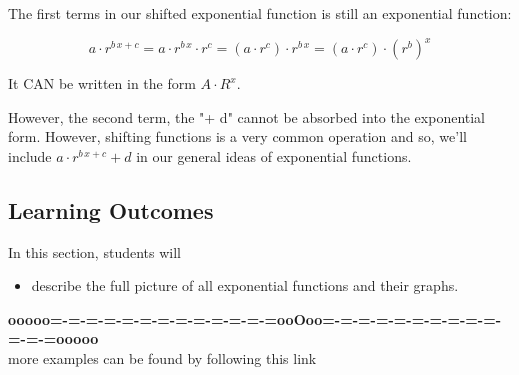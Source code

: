 \documentclass{ximera}
\begin{document}
The first terms in our shifted exponential function is still an exponential function:

\[
a \cdot r^{b \, x + c} = a \cdot r^{b \, x} \cdot  r^c = (a \cdot r^c) \cdot r^{b \, x} = (a \cdot r^c) \cdot (r^b)^x 
\]

It CAN be written in the form $A \cdot R^x$.


However, the second term, the "+ d" cannot be absorbed into the exponential form.  However, shifting functions is a very common operation and so, we'll include $a \cdot r^{b \, x + c} + d$ in our general ideas of exponential functions.





\subsection{Learning Outcomes}


\begin{sectionOutcomes}
In this section, students will 

\begin{itemize}
\item describe the full picture of all exponential functions and their graphs.
\end{itemize}
\end{sectionOutcomes}












\begin{center}
\textbf{\textcolor{green!50!black}{ooooo=-=-=-=-=-=-=-=-=-=-=-=-=ooOoo=-=-=-=-=-=-=-=-=-=-=-=-=ooooo}} \\

more examples can be found by following this link\\ 

\end{center}
\end{document}
